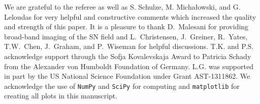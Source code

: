 \documentclass[traditabstract, referee]{aa}
\begin{document}
\begin{acknowledgements}

{We are grateful to the referee as well as S. Schulze, M. {Micha{\l}owski}, and G. Leloudas for very helpful and constructive comments which increased the quality and strength of this paper.} It is a pleasure to thank D.~Malesani for providing broad-band imaging of the SN field and L.~Christensen, J.~Greiner, R.~Yates, T.W.~Chen, J.~Graham, and P.~Wiseman for helpful discussions. T.K. and P.S. acknowledge support through the Sofja Kovalevskaja Award to Patricia Schady from the Alexander von Humboldt Foundation of Germany. L.G. was supported in part by the US National Science Foundation under Grant AST-1311862. We acknowledge the use of \texttt{NumPy} and \texttt{SciPy} \citep{Walt:2011:NAS:1957373.1957466} for computing and \texttt{matplotlib} \citep{Hunter:2007} for creating all plots in this manuscript. 

\end{acknowledgements}



\end{document}
